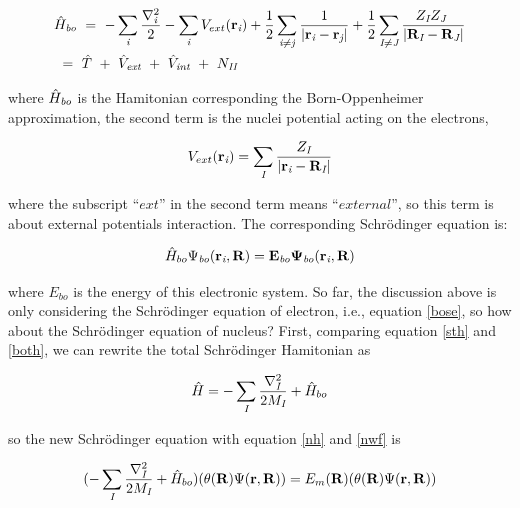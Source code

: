 \documentclass[a4paper]{report}
\begin{document}
\begin{equation}\label{both}\begin{split}
&{\hath}_\textit{bo}\ =\ - \sumi<i>   \frac{{{\nabla}_{\textit{i}}^{2}}}{2}  - \sumi<i> V_{ext}(\textbf{r}_{\textit{i}})  + \frac{1}{2} \suminj<i><j> \frac{1}{ |\textbf{r}_\textit{i}-\textbf{r}_\textit{j}|} + \frac{1}{2} \suminj<I><J> \frac{Z_\textit{I} Z_\textit{J}\ }{|\textbf{R}_\textit{I}-\textbf{R}_\textit{J}|} \\
&\ = \ \hat{T} \ + \ \hat{V}_\textit{ext} \ + \ \hat{V}_\textit{int}\ + \ N_\textit{II}
\end{split}\end{equation}

\noindent where ${\hat{H}}_\textit{bo}$  is the Hamitonian corresponding the Born-Oppenheimer approximation, the second term is the nuclei potential acting on the
electrons, 

\begin{equation}
V_{ext}(\textbf{r}_{\textit{i}}) =  \sumi<I> \frac{Z_\textit{I}}{|\textbf{r}_\textit{i}-\textbf{R}_\textit{I}|}
\end{equation}

\noindent where the subscript “$ext$” in the second term means “$external$”, so this term is about external potentials interaction. 
The corresponding Schrödinger equation is:

\begin{equation}\label{bose}
{\hat{H}}_{bo} \Psi_{\textit{bo}}({\textbf{r}_{\textit{i}}},\bf{R} ) = E_\textit{bo} {\Psi_{\textit{bo}}({\textbf{r}_{\textit{i}}},\bf{R} )}
\end{equation}

\noindent where $E_\textit{bo}$ is the energy of this electronic system. So far,
the discussion above is only considering the Schrödinger equation of electron, i.e., equation \ref{bose}, so how about the Schrödinger equation of nucleus? First, comparing equation
\ref{sth} and \ref{both}, we can rewrite the total Schrödinger Hamitonian as 

\begin{equation}\label{nh}
 {\hath} = - \sumi<I> \frac{{{\nabla}_{\textit{I}}^{2}}}{2 M_\textit{I}} + {\hath}_{bo}
\end{equation}

\noindent so the new Schrödinger equation with equation \ref{nh} and \ref{nwf} is 

\begin{equation}
 (- \sumi<I> \frac{{{\nabla}_{\textit{I}}^{2}}}{2 M_\textit{I}} + {\hath}_{bo} ) ( {\theta(\bf{R})} {\Psi(\bf{r}, \bf{R})}) = E_{m}({\bf R}) ({\theta(\bf{R})} {\Psi(\bf{r}, \bf{R})} )
\end{equation}
 
\end{document}

